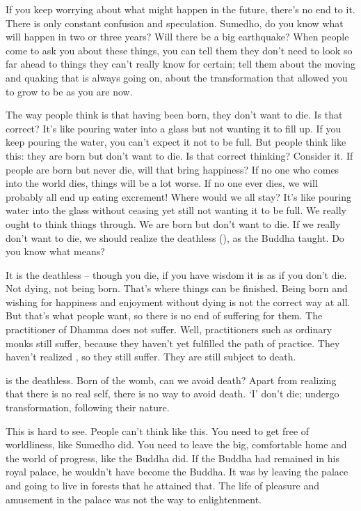 If you keep worrying about what might happen in the future, there's no end to it. There is only constant confusion and speculation. Sumedho, do you know what will happen in two or three years? Will there be a big earthquake? When people come to ask you about these things, you can tell them they don't need to look so far ahead to things they can't really know for certain; tell them about the moving and quaking that is always going on, about the transformation that allowed you to grow to be as you are now.

The way people think is that having been born, they don't want to die. Is that correct? It's like pouring water into a glass but not wanting it to fill up. If you keep pouring the water, you can't expect it not to be full. But people think like this: they are born but don't want to die. Is that correct thinking? Consider it. If people are born but never die, will that bring happiness? If no one who comes into the world dies, things will be a lot worse. If no one ever dies, we will probably all end up eating excrement! Where would we all stay? It's like pouring water into the glass without ceasing yet still not wanting it to be full. We really ought to think things through. We are born but don't want to die. If we really don't want to die, we should realize the deathless (), as the Buddha taught. Do you know what  means?

It is the deathless -- though you die, if you have wisdom it is as if you don't die. Not dying, not being born. That's where things can be finished. Being born and wishing for happiness and enjoyment without dying is not the correct way at all. But that's what people want, so there is no end of suffering for them. The practitioner of Dhamma does not suffer. Well, practitioners such as ordinary monks still suffer, because they haven't yet fulfilled the path of practice. They haven't realized , so they still suffer. They are still subject to death.

 is the deathless. Born of the womb, can we avoid death? Apart from realizing that there is no real self, there is no way to avoid death. `I' don't die;  undergo transformation, following their nature.

This is hard to see. People can't think like this. You need to get free of worldliness, like Sumedho did. You need to leave the big, comfortable home and the world of progress, like the Buddha did. If the Buddha had remained in his royal palace, he wouldn't have become the Buddha. It was by leaving the palace and going to live in forests that he attained that. The life of pleasure and amusement in the palace was not the way to enlightenment.

